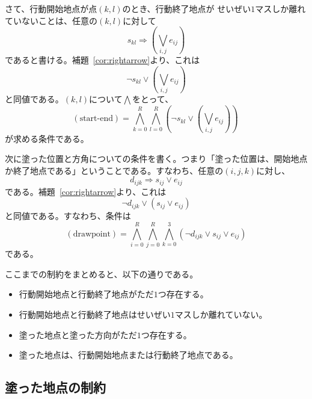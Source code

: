 さて、行動開始地点が点$(k, l)$のとき、行動終了地点が
せいぜい$1$マスしか離れていないことは、任意の$(k, l)$に対して
\[
 s_{kl} \Rightarrow \left( \bigvee_{i, j} e_{ij} \right)
\]
であると書ける。補題~\ref{cor:rightarrow}より、これは
\[
 \lnot s_{kl} \lor \left( \bigvee_{i, j} e_{ij} \right)
\]
と同値である。$(k, l)$について$\bigwedge$をとって、
\[
 (\text{start-end}) = \bigwedge_{k = 0}^R \bigwedge_{l = 0}^R 
 \left(\lnot s_{kl} \lor \left( \bigvee_{i, j} e_{ij} \right) \right)\
\]
が求める条件である。

次に塗った位置と方角についての条件を書く。つまり「塗った位置は、開始地点
か終了地点である」ということである。すなわち、任意の$(i, j, k)$に対し、
\[
 d_{ijk} \Longrightarrow s_{ij} \lor e_{ij}
\]
である。補題~\ref{cor:rightarrow}より、これは
\[
 \lnot d_{ijk} \lor (s_{ij} \lor e_{ij})
\]
と同値である。すなわち、条件は
\[
 (\text{drawpoint}) =
 \bigwedge_{i = 0}^{R} \bigwedge_{j = 0}^R \bigwedge_{k = 0}^3
 (\lnot d_{ijk} \lor s_{ij} \lor e_{ij})
\]
である。

\begin{rem}
 ここまでの制約をまとめると、以下の通りである。
 \begin{itemize}
  \item 行動開始地点と行動終了地点がただ$1$つ存在する。
  \item 行動開始地点と行動終了地点はせいぜい$1$マスしか離れていない。
  \item 塗った地点と塗った方向がただ$1$つ存在する。
  \item 塗った地点は、行動開始地点または行動終了地点である。
 \end{itemize}
\end{rem}

\subsection{塗った地点の制約}



